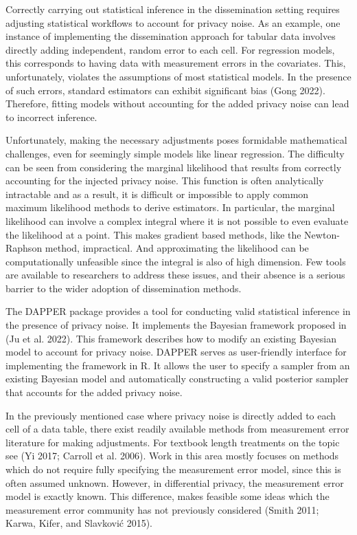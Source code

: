 Correctly carrying out statistical inference in the dissemination setting
requires adjusting statistical workflows to account for privacy noise.
As an example, one instance of implementing the dissemination approach for tabular data involves directly
adding independent, random error to each cell. For regression models,
this corresponds to having data with measurement errors
in the covariates. This, unfortunately, violates the assumptions of most statistical models.
In the presence of such errors, standard estimators can exhibit significant bias (Gong 2022).
Therefore, fitting models without accounting for the added privacy noise can lead to incorrect inference.

Unfortunately, making the necessary adjustments poses formidable mathematical
challenges, even for seemingly simple models like linear regression.
The difficulty can be seen from considering the marginal likelihood that results from correctly accounting for the injected
privacy noise. This function is often analytically intractable and as a result,
it is difficult or impossible to apply common maximum likelihood methods
to derive estimators. In particular, the marginal likelihood can involve a complex
integral where it is not possible to even evaluate the likelihood
at a point. This makes gradient based methods, like the Newton-Raphson method,
impractical. And approximating the likelihood can be computationally
unfeasible since the integral is also of high dimension.
Few tools are available to researchers to address these issues,
and their absence is a serious barrier to the wider adoption
of dissemination methods.

The DAPPER package provides a tool for conducting
valid statistical inference in the presence of privacy noise.
It implements the Bayesian framework proposed in (Ju et al. 2022). This framework describes how to modify
an existing Bayesian model to account for privacy noise. DAPPER
serves as user-friendly interface for implementing the framework in R. It allows the
user to specify a sampler from an existing Bayesian model and
automatically constructing a valid posterior sampler that accounts for the
added privacy noise.

In the previously mentioned case where privacy noise is
directly added to each cell of a data table, there exist
readily available methods from measurement error literature for making adjustments.
For textbook length treatments on the topic see (Yi 2017; Carroll et al. 2006).
Work in this area mostly focuses on methods which do not require fully specifying the
measurement error model, since this is often assumed unknown.
However, in differential privacy, the measurement error model is exactly known.
This difference, makes feasible some ideas which the measurement
error community has not previously considered (Smith 2011; Karwa, Kifer, and Slavković 2015).

